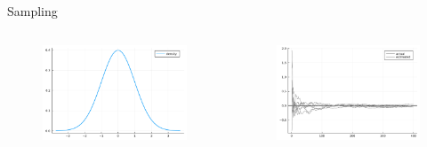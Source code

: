 \documentclass[aspectratio=169,xcolor=svgnames]{beamer}
\begin{document}
\begin{frame}{Sampling}
  \begin{columns}
    \begin{column}{0.4\textwidth}
    \begin{figure}[ht]
        \centering
        \includegraphics[width=\textwidth]{figures/normal_distribution.pdf}
    \end{figure}
    \end{column}
    \begin{column}{0.6\textwidth}
      \begin{figure}[ht]
        \centering
        \includegraphics[width=\textwidth]{figures/mean_error.pdf}
      \end{figure}
    \end{column}
  \end{columns}
\end{frame}
\end{document}
